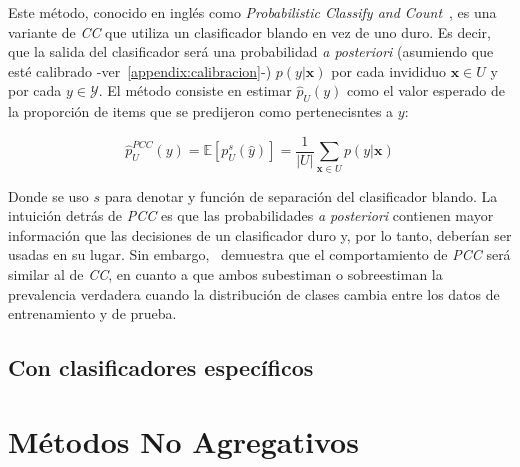 Este método, conocido en inglés como {\it Probabilistic Classify and
Count\/}~\cite{bella2010quantification, tang2010network}, es una variante de
{\it CC\/} que utiliza un clasificador blando en vez de uno duro. Es decir, que
la salida del clasificador será una probabilidad {\it a posteriori\/} (asumiendo
que esté calibrado -ver~\ref{appendix:calibracion}-) $p(y|\mathbf{x})$ por cada
invididuo $\mathbf{x} \in U$ y por cada $y \in \mathcal{Y}$. El método consiste
en estimar $\hat p_{U}(y)$ como el valor esperado de la proporción de items que
se predijeron como pertenecisntes a $y$:

\begin{equation}
    \hat p^{PCC}_{U}(y) = \mathbb{E}[p_{U}^{s}(\hat y)] = \frac{1}{|U|}\sum_{\mathbf{x} \in U}{p(y|\mathbf{x})}
\end{equation}

Donde se uso $s$ para denotar y función de separación del clasificador blando.
La intuición detrás de {\it PCC\/} es que las probabilidades {\it a
posteriori\/} contienen mayor información que las decisiones de un clasificador
duro y, por lo tanto, deberían ser usadas en su lugar. Sin
embargo,~\citet[Corolario 6, p. 157 y p.163]{tasche2014exact} demuestra que el
comportamiento de {\it PCC\/} será similar al de {\it CC}, en cuanto a que ambos
subestiman o sobreestiman la prevalencia verdadera cuando la distribución de
clases cambia entre los datos de entrenamiento y de prueba.

\subsection{Con clasificadores específicos}

\section{Métodos No Agregativos}
